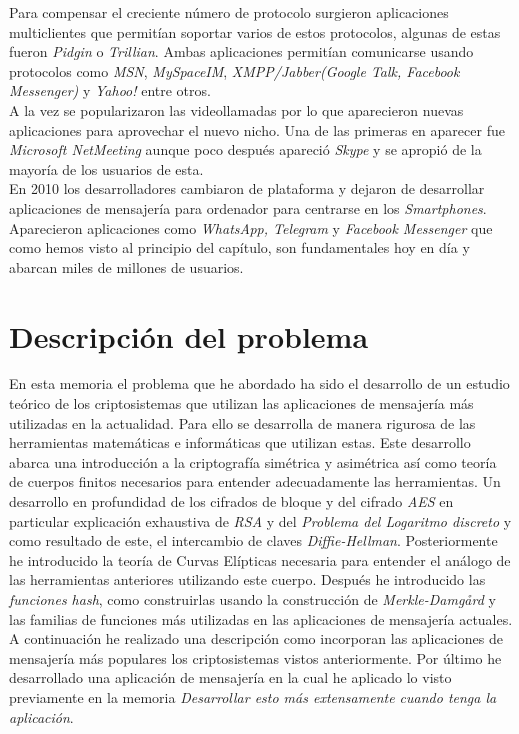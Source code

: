 Para compensar el creciente número de protocolo surgieron aplicaciones multiclientes que permitían soportar varios de estos protocolos, algunas de estas fueron \emph{Pidgin} o \emph{Trillian}. Ambas aplicaciones permitían comunicarse usando protocolos como \emph{MSN}, \emph{MySpaceIM}, \emph{XMPP/Jabber(Google Talk, Facebook Messenger)} y \emph{Yahoo!} entre otros.\\ 
A la vez se popularizaron las videollamadas por lo que aparecieron nuevas aplicaciones para aprovechar el nuevo nicho. Una de las primeras en aparecer fue \emph{Microsoft NetMeeting} aunque poco después apareció \emph{Skype} y se apropió de la mayoría de los usuarios de esta.\\
En 2010 los desarrolladores cambiaron de plataforma y dejaron de desarrollar aplicaciones de mensajería para ordenador para centrarse en los \emph{Smartphones}. Aparecieron aplicaciones como \emph{WhatsApp, Telegram} y \emph{Facebook Messenger} que como hemos visto al principio del capítulo, son fundamentales hoy en día y abarcan miles de millones de usuarios.

\section{Descripción del problema}
En esta memoria el problema que he abordado ha sido el desarrollo de un estudio teórico de los criptosistemas que utilizan las aplicaciones de mensajería más utilizadas en la actualidad. Para ello se desarrolla de manera rigurosa de las herramientas matemáticas e informáticas que utilizan estas. Este desarrollo abarca una introducción a la criptografía simétrica y asimétrica así como teoría de cuerpos finitos necesarios para entender adecuadamente las herramientas.
Un desarrollo en profundidad de los cifrados de bloque y del cifrado \emph{AES} en particular explicación exhaustiva de \emph{RSA} y del \emph{Problema del Logaritmo discreto} y como resultado de este, el intercambio de claves \emph{Diffie-Hellman}. Posteriormente he introducido la teoría de Curvas Elípticas necesaria para entender el análogo de las herramientas anteriores utilizando este cuerpo.
Después he introducido las \emph{funciones hash}, como construirlas usando la construcción de \emph{Merkle-Damgård} y las familias de funciones más utilizadas en las aplicaciones de mensajería actuales. A continuación he realizado una descripción como incorporan las aplicaciones de mensajería más populares los criptosistemas vistos anteriormente. Por último he desarrollado una aplicación de mensajería en la cual he aplicado lo visto previamente en la memoria \emph{Desarrollar esto más extensamente cuando tenga la aplicación}. 

